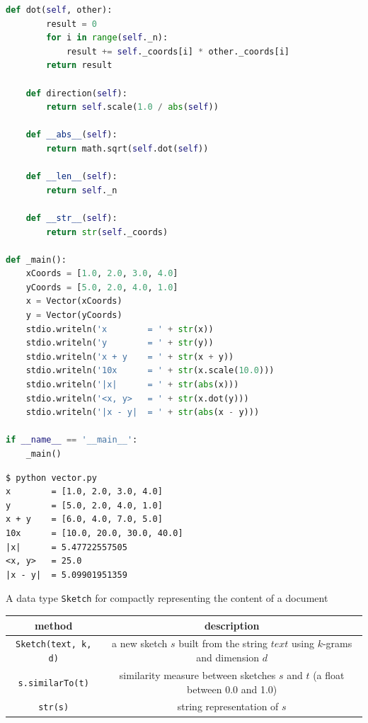 \documentclass[8pt,a4paper,compress]{beamer}
\begin{document}
\begin{frame}[fragile]
\pause

\begin{lstlisting}[language=Python]
    def dot(self, other):
        result = 0
        for i in range(self._n):
            result += self._coords[i] * other._coords[i]
        return result

    def direction(self):
        return self.scale(1.0 / abs(self))
     
    def __abs__(self):
        return math.sqrt(self.dot(self))

    def __len__(self):
        return self._n

    def __str__(self):
        return str(self._coords)
        
def _main():
    xCoords = [1.0, 2.0, 3.0, 4.0]
    yCoords = [5.0, 2.0, 4.0, 1.0]
    x = Vector(xCoords)
    y = Vector(yCoords)
    stdio.writeln('x        = ' + str(x))
    stdio.writeln('y        = ' + str(y))
    stdio.writeln('x + y    = ' + str(x + y))
    stdio.writeln('10x      = ' + str(x.scale(10.0)))
    stdio.writeln('|x|      = ' + str(abs(x)))
    stdio.writeln('<x, y>   = ' + str(x.dot(y)))
    stdio.writeln('|x - y|  = ' + str(abs(x - y)))

if __name__ == '__main__':
    _main()
\end{lstlisting}
\end{frame}

\begin{frame}[fragile]
\pause

\begin{lstlisting}[language={}]
$ python vector.py
x        = [1.0, 2.0, 3.0, 4.0]
y        = [5.0, 2.0, 4.0, 1.0]
x + y    = [6.0, 4.0, 7.0, 5.0]
10x      = [10.0, 20.0, 30.0, 40.0]
|x|      = 5.47722557505
<x, y>   = 25.0
|x - y|  = 5.09901951359
\end{lstlisting}
\end{frame}

\begin{frame}[fragile]
\pause

A data type \lstinline{Sketch} for compactly representing the content of a document
\begin{center}
\begin{tabular}{cc}
method & description \\ \hline
\lstinline$Sketch(text, k, d)$ & \makecell{a new sketch $s$ built from the string $text$ \\ using $k$-grams and dimension $d$} \\
\lstinline$s.similarTo(t)$ & \makecell{similarity measure between sketches $s$ and $t$ (a float \\ between 0.0 and 1.0)} \\
\lstinline$str(s)$ & string representation of $s$
\end{tabular} 
\end{center}
\end{frame}
\end{document}
